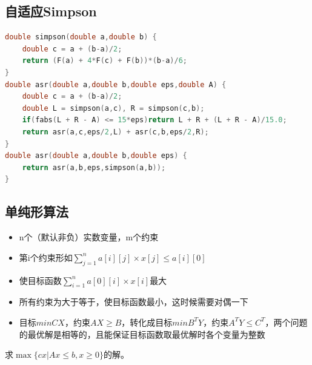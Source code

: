 \documentclass[UTF8,a4paper,titlepage]{ctexart}
\begin{document}
\subsection{自适应Simpson}

\begin{lstlisting}[language=C++]
double simpson(double a,double b) {
    double c = a + (b-a)/2;
    return (F(a) + 4*F(c) + F(b))*(b-a)/6;
}
double asr(double a,double b,double eps,double A) {
    double c = a + (b-a)/2;
    double L = simpson(a,c), R = simpson(c,b);
    if(fabs(L + R - A) <= 15*eps)return L + R + (L + R - A)/15.0;
    return asr(a,c,eps/2,L) + asr(c,b,eps/2,R);
}
double asr(double a,double b,double eps) {
    return asr(a,b,eps,simpson(a,b));
}
\end{lstlisting}
\subsection{单纯形算法}
\begin{itemize}
	\item n个（默认非负）实数变量，m个约束
	\item 第i个约束形如$ \sum_{j=1}^{n}a[i][j]\times x[j] \leq a[i][0] $
	\item 使目标函数$ \sum_{i=1}^{n}a[0][i] \times x[i]$最大
	\item 所有约束为大于等于，使目标函数最小，这时候需要对偶一下
	\item 目标$min{CX}$，约束$AX\geq B$，转化成目标$min{B^T Y}$，约束$A^T Y \leq C^T$，两个问题的最优解是相等的，且能保证目标函数取最优解时各个变量为整数
\end{itemize}
求$\max\{cx|Ax\leq b,x\geq0\}$的解。
\end{document}
